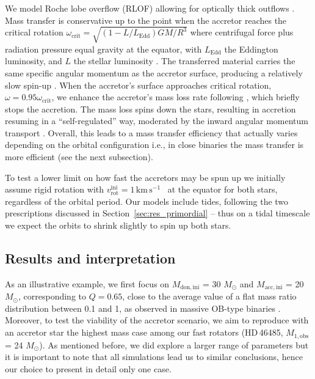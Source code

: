 \documentclass{aa}
\newcommand{\kms}{$\mathrm{km\,s^{-1}}$}
\DeclareRobustCommand{\Secref}[1]{Section~\ref{#1}}
\begin{document}
We model Roche lobe overflow (RLOF) allowing
  for optically thick outflows \citep{Kolb_1990}. Mass
transfer is conservative up to the point when the
accretor reaches the critical rotation
$\omega_\mathrm{crit}=\sqrt{(1-L/L_\mathrm{Edd})GM/R^3}$ where centrifugal force plus radiation pressure equal
  gravity at the equator, with $L_\mathrm{Edd}$ the Eddington
  luminosity, and $L$ the stellar luminosity \citep[e.g.,][]{Petrovic_2005,Heuvel_2017}. The transferred
  material carries the same specific angular momentum as the accretor
  surface, producing a relatively slow spin-up \citep{Renzo_2021}.
When the accretor's surface approaches critical
  rotation, $\omega = 0.95\omega_\mathrm{crit}$, we enhance the
  accretor's mass loss rate following \cite{langer:98}, which briefly
  stops the accretion. The mass loss spins down the stars, resulting in
  accretion resuming in a ``self-regulated'' way, moderated by the
  inward angular momentum transport \citep[e.g.,][]{Renzo_2021}. Overall, this leads
  to a mass transfer efficiency \citep[$\eta =\Delta M_\mathrm{acc}/\Delta M_\mathrm{don}$ as it has been introduced in][]{Soberman_1997} that actually varies depending on the orbital configuration i.e., in close binaries the mass transfer is more efficient (see the next subsection).

To test a lower limit on how fast the accretors may be spun up we
  initially assume rigid rotation with $v_\mathrm{rot}^\mathrm{ini} = 1$\,\kms~ at the equator for both stars, regardless of the orbital period.
Our models include tides, following the two prescriptions
  discussed in \Secref{sec:res_primordial} -- thus on a tidal
  timescale we expect the orbits to shrink slightly to spin up both
  stars. 



\subsection{Results and interpretation}



As an illustrative example, we first focus on $M_\mathrm{don,ini}$ = 30 $M_{\odot}$ and
$M_\mathrm{acc,ini}$ = 20 $M_{\odot}$, corresponding to $Q=0.65$, close
to the average value of a flat mass ratio distribution between 0.1 and
1, as observed in massive OB-type binaries \citep[see][]{Vanbeveren_1981,Sana_2013}. Moreover, to test the
  viability of the accretor scenario, we aim to reproduce with an
  accretor star the highest mass case among our fast rotators (HD\,46485, $M_\mathrm{1, obs}$ = 24 $M_{\odot}$).
As mentioned before, we did explore a larger range of parameters but it is important to note that all simulations lead us to similar conclusions, hence our choice to present in detail only one case.
\end{document}
